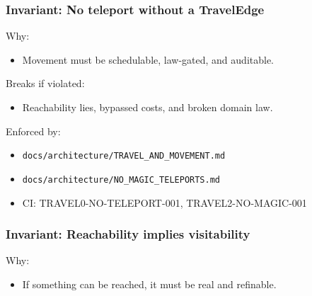 \documentclass[9pt,a4paper,openany]{book}
\begin{document}
\subsubsection{Invariant: No teleport without a TravelEdge}


Why:



\begin{itemize}
\item Movement must be schedulable, law-\allowbreak{}gated, and auditable.\allowbreak{}
\end{itemize}


Breaks if violated:



\begin{itemize}
\item Reachability lies, bypassed costs, and broken domain law.\allowbreak{}
\end{itemize}


Enforced by:



\begin{itemize}
\item \texttt{docs/\allowbreak{}architecture/\allowbreak{}TRAVEL\_\allowbreak{}AND\_\allowbreak{}MOVEMENT.\allowbreak{}md}
\end{itemize}


\begin{itemize}
\item \texttt{docs/\allowbreak{}architecture/\allowbreak{}NO\_\allowbreak{}MAGIC\_\allowbreak{}TELEPORTS.\allowbreak{}md}
\end{itemize}


\begin{itemize}
\item CI: TRAVEL0-\allowbreak{}NO-\allowbreak{}TELEPORT-\allowbreak{}001, TRAVEL2-\allowbreak{}NO-\allowbreak{}MAGIC-\allowbreak{}001
\end{itemize}





\subsubsection{Invariant: Reachability implies visitability}


Why:



\begin{itemize}
\item If something can be reached, it must be real and refinable.\allowbreak{}
\end{itemize}
\end{document}
